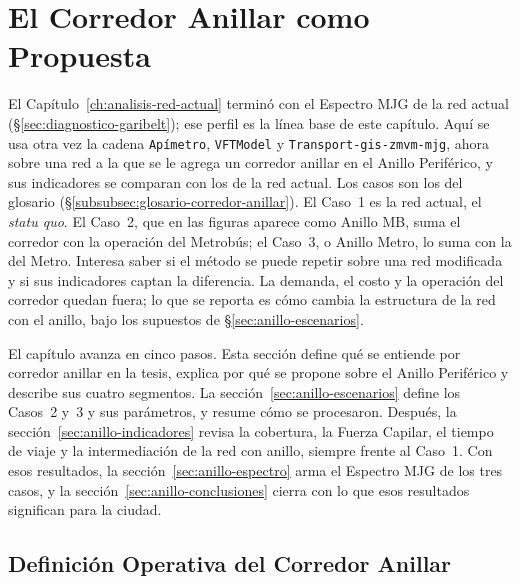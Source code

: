 \section{El Corredor Anillar como Propuesta}
\label{sec:corredor-anillar}

El Capítulo~\ref{ch:analisis-red-actual} terminó con el Espectro MJG de la red
actual (§\ref{sec:diagnostico-garibelt}); ese perfil es la línea base de este
capítulo. Aquí se usa otra vez la cadena \texttt{Apímetro},
\texttt{VFTModel} y \texttt{Transport-gis-zmvm-mjg}, ahora sobre una red a la
que se le agrega un corredor anillar en el Anillo Periférico, y sus
indicadores se comparan con los de la red actual. Los casos son los del
glosario (§\ref{subsubsec:glosario-corredor-anillar}). El Caso~1 es la red
actual, el \textit{statu quo}. El Caso~2, que en las figuras aparece como Anillo MB, suma el
corredor con la operación del Metrobús; el Caso~3, o Anillo Metro, lo suma con
la del Metro. Interesa saber si el método se puede repetir sobre una red
modificada y si sus indicadores captan la diferencia. La demanda, el costo y la
operación del corredor quedan fuera; lo que se reporta es cómo cambia la
estructura de la red con el anillo, bajo los supuestos de
§\ref{sec:anillo-escenarios}.

El capítulo avanza en cinco pasos. Esta sección define qué se entiende por
corredor anillar en la tesis, explica por qué se propone sobre el Anillo
Periférico y describe sus cuatro segmentos. La sección~\ref{sec:anillo-escenarios}
define los Casos~2 y~3 y sus parámetros, y resume cómo se procesaron. Después,
la sección~\ref{sec:anillo-indicadores} revisa la cobertura, la Fuerza Capilar,
el tiempo de viaje y la intermediación de la red con anillo, siempre frente al
Caso~1. Con esos resultados, la sección~\ref{sec:anillo-espectro} arma el
Espectro MJG de los tres casos, y la sección~\ref{sec:anillo-conclusiones}
cierra con lo que esos resultados significan para la ciudad.

\subsection{Definición Operativa del Corredor Anillar}
\label{subsec:corredor-anillar-definicion}

